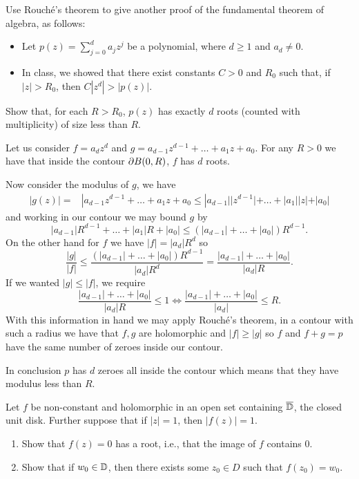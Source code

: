 \documentclass[12pt]{memoir}
\begin{document}
\begin{Ej}
    Use Rouché's theorem to give another proof of the fundamental theorem of algebra, as follows:
    \begin{itemize}
        \itemsep=-0.4em 
        \item Let $p(z)=\sum_{j=0}^{d} a_jz^j$ be a polynomial, where $d\geq 1$ and $a_d\neq 0$.
        \item In class, we showed that there exist constants $C > 0$ and $R_0$ such that, if $|z| > R_0$, then $C|z^d|>|p(z)|$.
    \end{itemize}
Show that, for each $R > R_0$, $p(z)$ has exactly $d$ roots (counted with multiplicity) of size less
than $R$.
\end{Ej}
\begin{ptcbr}
    Let us consider $f=a_dz^d$ and $g=a_{d-1}z^{d-1}+\dots+a_1z+a_0$. For any $R>0$ we have that inside the contour $\partial B(0,R)$, $f$ has $d$ roots.\par 
    Now consider the modulus of $g$, we have
    \begin{align*}
        |g(z)|=&|a_{d-1}z^{d-1}+\dots+a_1z+a_0\leq|a_{d-1}||z^{d-1}|+\dots+|a_1||z|+|a_0|
    \end{align*}
    and working in our contour we may bound $g$ by 
    $$|a_{d-1}|R^{d-1}+\dots+|a_1|R+|a_0|\leq (|a_{d-1}|+\dots+|a_0|)R^{d-1}.$$
    On the other hand for $f$ we have $|f|=|a_d|R^d$ so 
    $$\frac{|g|}{|f|}\leq \frac{(|a_{d-1}|+\dots+|a_0|)R^{d-1}}{|a_d|R^d}=\frac{|a_{d-1}|+\dots+|a_0|}{|a_d|R}.$$
    If we wanted $|g|\leq |f|$, we require 
    $$\frac{|a_{d-1}|+\dots+|a_0|}{|a_d|R}\leq 1\iff \frac{|a_{d-1}|+\dots+|a_0|}{|a_d|}\leq R.$$
    With this information in hand we may apply Rouché's theorem, in a contour with such a radius we have that $f,g$ are holomorphic and $|f|\geq |g|$ so $f$ and $f+g=p$ have the same number of zeroes inside our contour.\par 
    In conclusion $p$ has $d$ zeroes all inside the contour which means that they have modulus less than $R$.
\end{ptcbr}

\begin{Ej}
    Let $f$ be non-constant and holomorphic in an open set containing $\overline {\mathbb{D}}$, the closed unit disk. Further suppose that if $|z| = 1$, then $| f (z)| = 1$.
    \begin{enumerate}
        \item Show that $f (z) = 0$ has a root, i.e., that the image of $f$ contains $0$. 
        \item Show that if $w_0\in \mathbb{D}$, then there exists some $z_0\in D$ such that $f(z_0)=w_0$. 
    \end{enumerate}
\end{Ej}
\end{document}
